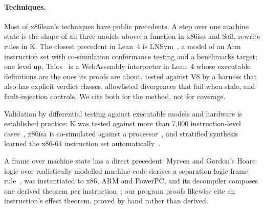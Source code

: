 \documentclass[runningheads]{llncs}
\newcommand{\src}[1]{}  %
\begin{document}
\paragraph{Techniques.}
Most of x86lean's techniques have public precedents. A step over one machine state is
the shape of all three models above: a function in x86isa and Sail, rewrite rules in K. The closest precedent in Lean~4 is
LNSym~\cite{lnsym-repo}, a model of an Arm instruction set with co-simulation conformance testing and a
benchmarks target; one level up, Talos~\cite{talos-repo} is a WebAssembly interpreter in Lean~4 whose executable definitions are the ones its proofs are about, tested against V8 by a harness that also has explicit verdict classes, allowlisted
divergences that fail when stale, and fault-injection controls. We cite both for the method, not for coverage.
\src{docs/TACAS-G6-RELATED-WORK.md 1 row 7 (VERIFIED at its README) and the LNSym ruling in 6; the Talos row of 4, read at its
README and .github/workflows/differential.yml at 80644390de3a, 2026-10-09; scripts/tests/test\_differential\_ci.py there, read 2026-10-14}
Validation by differential testing against executable models and hardware is established practice:
K was tested against more than 7{,}000 instruction-level cases~\cite{dasgupta-k-x86}, x86isa is
co-simulated against a processor~\cite{goel-x86isa}, and stratified synthesis learned the x86-64
instruction set automatically~\cite{heule-stratified}.
\src{docs/CLAIMS.tsv[k\_tests]; docs/TACAS-G6-RELATED-WORK.md 4, the differential and co-simulation rows;
each attribution re-read at its source 2026-09-13 (D236): the PLDI 2019 abstract via api.semanticscholar.org for DOI
10.1145/3314221.3314601, ``has been tested against more than 7,000 instruction-level test cases''; arXiv:1705.01225's
section 1, ``run co-simulations against an actual x86 processor for model validation'' (this marker said ``abstract'' until
2026-09-15: the phrase is not in the abstract, re-read at DataCite and the PDF, D249); the PLDI 2016 title, ``Automatically
Learning the x86-64 Instruction Set''}
A frame over machine state has a direct precedent: Myreen and Gordon's Hoare logic over realistically modelled machine
code derives a separation-logic frame rule~\cite{myreen-hoare-machine-code}, was instantiated to x86, ARM and
PowerPC, and its decompiler composes one derived theorem per instruction~\cite{myreen-multiple-architectures,myreen-decompilation-improved};
our program proofs likewise cite an instruction's effect theorem, proved by hand rather than derived.
\src{author PDFs and the author's bibtex (cse.chalmers.se/\textasciitilde myreen), read 2026-09-12: TACAS 2007
section 3.2, ``only the part initially satisfying P has been changed'' and ``The following frame-rule, similar
to that of separation logic, easily follows''; FMCAD 2008 section III, the frame rule derived from the triple; FMCAD 2012 sections II and III, Phase 1 and Fig.~1;
Tests/Program.lean cites step\_* effect theorems and never step itself; docs/TACAS-G6-RELATED-WORK.md 5;
docs/DECISIONS.md D222}
\end{document}
